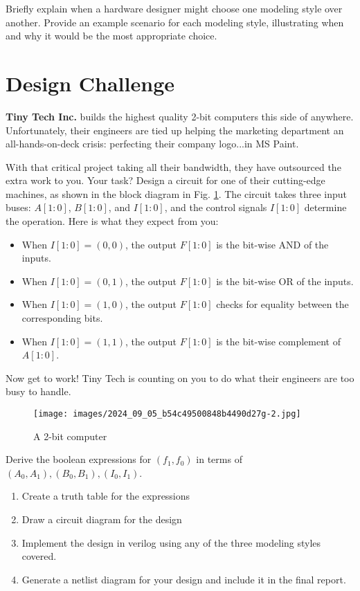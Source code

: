 \documentclass[12pt]{journal}
\begin{document}
\begin{question}
    Briefly explain when a hardware designer might choose one modeling style over another. Provide an example scenario for each modeling style, illustrating when and why it would be the most appropriate choice.
\end{question}

\clearpage
\section{Design Challenge}


\textbf{Tiny Tech Inc.} builds the highest quality 2-bit computers this side of anywhere. Unfortunately, their engineers are tied up helping the marketing department an all-hands-on-deck crisis: perfecting their company logo...in MS Paint.

With that critical project taking all their bandwidth, they have outsourced the extra work to you. Your task? Design a circuit for one of their cutting-edge machines, as shown in the block diagram in Fig. \ref{fig:2bitblock}. The circuit takes three input buses: \(A[1:0]\), \(B[1:0]\), and \(I[1:0]\), and the control signals \(I[1:0]\) determine the operation. Here is what they expect from you:

\begin{itemize}
  \item When \(I[1:0] = (0,0)\), the output \(F[1:0]\) is the bit-wise AND of the inputs.
  \item When \(I[1:0] = (0,1)\), the output \(F[1:0]\) is the bit-wise OR of the inputs.
  \item When \(I[1:0] = (1,0)\), the output \(F[1:0]\) checks for equality between the corresponding bits.
  \item When \(I[1:0] = (1,1)\), the output \(F[1:0]\) is the bit-wise complement of \(A[1:0]\).
\end{itemize}

Now get to work! Tiny Tech is counting on you to do what their engineers are too busy to handle.

\begin{figure}
    \centering
    \texttt{[image: images/2024\_09\_05\_b54c49500848b4490d27g-2.jpg]}
    \caption{A 2-bit computer}
    \label{fig:2bitblock}
\end{figure}

\begin{question}
    Derive the boolean expressions for $(f_1, f_0)$ in terms of $(A_0, A_1), (B_0, B_1), (I_0, I_1)$.
    \begin{enumerate}
        \item Create a truth table for the expressions
        \item Draw a circuit diagram for the design
        \item Implement the design in verilog using any of the three modeling styles covered.
        \item Generate a netlist diagram for your design and include it in the final report.
    \end{enumerate}
\end{question}
\end{document}
